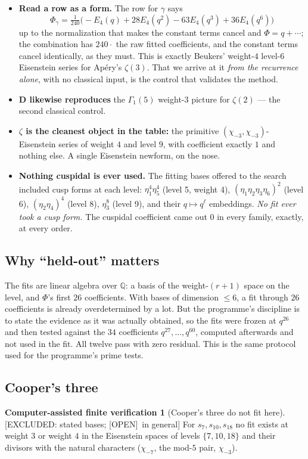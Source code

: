 \documentclass[11pt,reqno]{amsart}
\theoremstyle{plain}
\theoremstyle{definition}
\newtheorem{verification}[theorem]{Computer-assisted finite verification}
\theoremstyle{remark}
\newcommand{\Q}{\mathbb{Q}}
\newcommand{\chim}[1]{\chi_{-#1}}
\newcommand{\ExcludedR}[1]{\textup{\textsf{[EXCLUDED: #1]}}}
\newcommand{\Open}{\textup{\textsf{[OPEN]}}}
\begin{document}
\begin{itemize}[leftmargin=1.4em]
\item \textbf{Read a row as a form.} The row for $\gamma$ says
\[
\Phi_\gamma=\tfrac1{240}\bigl(-E_4(q)+28E_4(q^2)-63E_4(q^3)+36E_4(q^6)\bigr)
\]
up to the normalization that makes the constant terms cancel and
$\Phi=q+\cdots$; the combination has $240\cdot$ the raw fitted coefficients,
and the constant terms cancel identically, as they must. This is exactly
Beukers' weight-$4$ level-$6$ Eisenstein series for Ap\'ery's $\zeta(3)$.
That we arrive at it \emph{from the recurrence alone}, with no classical
input, is the control that validates the method.
\item \textbf{$\mathbf D$ likewise reproduces} the $\Gamma_1(5)$
weight-$3$ picture for $\zeta(2)$ --- the second classical control.
\item \textbf{$\zeta$ is the cleanest object in the table:} the primitive
$(\chim3,\chim3)$-Eisenstein series of weight $4$ and level $9$, with
coefficient exactly $1$ and nothing else. A single Eisenstein newform, on
the nose.
\item \textbf{Nothing cuspidal is ever used.} The fitting bases offered to
the search included cusp forms at each level: $\eta_1^4\eta_5^4$ (level 5,
weight 4), $(\eta_1\eta_2\eta_3\eta_6)^2$ (level 6), $(\eta_2\eta_4)^4$
(level 8), $\eta_3^8$ (level 9), and their $q\mapsto q^\ell$ embeddings.
\emph{No fit ever took a cusp form.} The cuspidal coefficient came out
$0$ in every family, exactly, at every order.
\end{itemize}

\subsection{Why ``held-out'' matters}
The fits are linear algebra over $\Q$: a basis of the weight-$(r+1)$ space
on the level, and $\Phi$'s first $26$ coefficients. With bases of dimension
$\le6$, a fit through $26$ coefficients is already overdetermined by a lot.
But the programme's discipline is to state the evidence as it was actually
obtained, so the fits were frozen at $q^{26}$ and then tested against the
$34$ coefficients $q^{27},\dots,q^{60}$, computed afterwards and not used in
the fit. All twelve pass with zero residual. This is the same protocol used
for the programme's prime tests.

\subsection{Cooper's three}
\begin{verification}[Cooper's three do not fit here]\label{ver:cooper}
\ExcludedR{stated bases; \Open\ in general}
For $s_7,s_{10},s_{18}$ no fit exists at weight $3$ or weight $4$ in the
Eisenstein spaces of levels $\{7,10,18\}$ and their divisors with the
natural characters ($\chim7$, the mod-$5$ pair, $\chim3$).
\end{verification}
\end{document}
